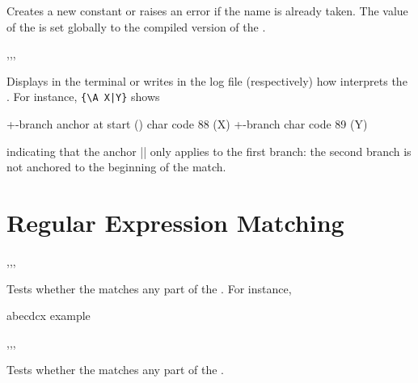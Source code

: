 \documentclass[oneside]{book}
\begin{document}
\begin{function}{\regexConst}
\begin{syntax}
  
\end{syntax}
Creates a new constant  or raises an error if the name
is already taken.  The value of the  is set
globally to the compiled version of the .
\end{function}

\begin{function}{\regexLog,\regexVarLog,\regexShow,\regexVarShow}
\begin{syntax}
 
 
 
 
\end{syntax}
Displays in the terminal or writes in the log file (respectively)
how  interprets the . For instance,
 \verb+{\A X|Y}+ shows
\begin{codehigh}
+-branch
  anchor at start (\A)
  char code 88 (X)
+-branch
  char code 89 (Y)
\end{codehigh}
indicating that the anchor |\A| only applies to the first branch:
the second branch is not anchored to the beginning of the match.
\end{function}

\section{Regular Expression Matching}

\begin{function}{\regexMatch,\regexMatchT,\regexMatchF,\regexMatchTF}
\begin{syntax}
  
   
   
    
\end{syntax}
Tests whether the  matches any part
of the . For instance,
\begin{demohigh}
 {abecdcx} {} {}
\regexMatchTF {[b-dq-w]} {example} {} {}
\end{demohigh}
\end{function}

\begin{function}{\regexVarMatch,\regexVarMatchT,\regexVarMatchF,\regexVarMatchTF}
\begin{syntax}
  
   
   
    
\end{syntax}
Tests whether the  matches any part of the .
\end{function}
\end{document}
